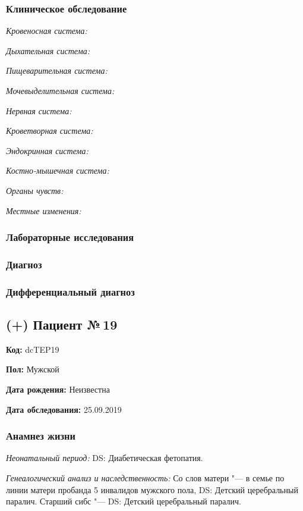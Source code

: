 \documentclass[a4paper,14pt]{extarticle}
\begin{document}
\subsubsection*{Клиническое обследование}

\emph{Кровеносная система:}

\emph{Дыхательная система:}

\emph{Пищеварительная система:}

\emph{Мочевыделительная система:}

\emph{Нервная система:} 

\emph{Кроветворная система:}

\emph{Эндокринная система:}

\emph{Костно-мышечная система:}

\emph{Органы чувств:}

\emph{Местные изменения:}

\subsubsection*{Лабораторные исследования}

\subsubsection*{Диагноз}

\subsubsection*{Дифференциальный диагноз}

\newpage
\subsection*{(+) Пациент №\,19}

\textbf{Код:} dcTEP19

\textbf{Пол:} Мужской

\textbf{Дата рождения:} Неизвестна

\textbf{Дата обследования:} 25.09.2019

\subsubsection*{Анамнез жизни}

\emph{Неонатальный период:} DS: Диабетическая фетопатия.

\emph{Генеалогический анализ и наследственность:} Со слов матери "--- в семье по линии матери пробанда 5 инвалидов мужского пола, DS: Детский церебральный паралич. Старший сибс "--- DS: Детский церебральный паралич.
\end{document}
